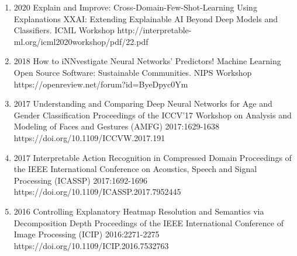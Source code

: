 \documentclass[10pt,a4paper]{article} %
\begin{document}
{\begin{enumerate}
        \item[] 
                                {2020}
                                {Explain and Improve: Cross-Domain-Few-Shot-Learning Using Explanations}
                                {XXAI: Extending Explainable AI Beyond Deep Models and Classifiers. ICML Workshop}
                                {}
                                {http://interpretable-ml.org/icml2020workshop/pdf/22.pdf}


        \item[] 
                                {2018}
                                {How to iNNvestigate Neural Networks' Predictors!}
                                {Machine Learning Open Source Software: Sustainable Communities. NIPS Workshop}
                                {}
                                {https://openreview.net/forum?id=ByeDpyc0Ym}


        \item[] 
                                {2017}
                                {Understanding and Comparing Deep Neural Networks for Age and Gender Classification}
                                {Proceedings of the ICCV'17 Workshop on Analysis and Modeling of Faces and Gestures (AMFG)}
                                {2017:1629-1638}
                                {https://doi.org/10.1109/ICCVW.2017.191}

        \item[] 
                                {2017}
                                {Interpretable Action Recognition in Compressed Domain}
                                {Proceedings of the IEEE International Conference on Acoustics, Speech and Signal Processing (ICASSP)}
                                {2017:1692-1696}
                                {https://doi.org/10.1109/ICASSP.2017.7952445}


        \item[] 
                                {2016}
                                {Controlling Explanatory Heatmap Resolution and Semantics via Decomposition Depth}
                                {Proceedings of the IEEE International Conference of Image Processing (ICIP)}
                                {2016:2271-2275}
                                {https://doi.org/10.1109/ICIP.2016.7532763}



\end{enumerate}}
\end{document}
